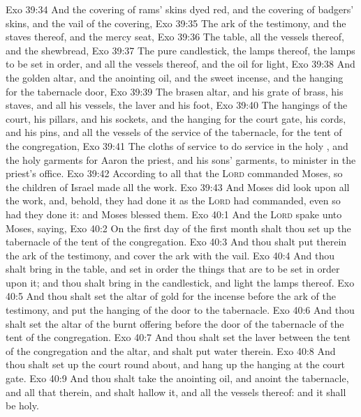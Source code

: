 \vs Exo 39:34 And the covering of rams' skins dyed red, and the covering of badgers' skins, and the vail of the covering,
\vs Exo 39:35 The ark of the testimony, and the staves thereof, and the mercy seat,
\vs Exo 39:36 The table,  all the vessels thereof, and the shewbread,
\vs Exo 39:37 The pure candlestick,  the lamps thereof,  the lamps to be set in order, and all the vessels thereof, and the oil for light,
\vs Exo 39:38 And the golden altar, and the anointing oil, and the sweet incense, and the hanging for the tabernacle door,
\vs Exo 39:39 The brasen altar, and his grate of brass, his staves, and all his vessels, the laver and his foot,
\vs Exo 39:40 The hangings of the court, his pillars, and his sockets, and the hanging for the court gate, his cords, and his pins, and all the vessels of the service of the tabernacle, for the tent of the congregation,
\vs Exo 39:41 The cloths of service to do service in the holy , and the holy garments for Aaron the priest, and his sons' garments, to minister in the priest's office.
\vs Exo 39:42 According to all that the \textsc{Lord} commanded Moses, so the children of Israel made all the work.
\vs Exo 39:43 And Moses did look upon all the work, and, behold, they had done it as the \textsc{Lord} had commanded, even so had they done it: and Moses blessed them.
\vs Exo 40:1 And the \textsc{Lord} spake unto Moses, saying,
\vs Exo 40:2 On the first day of the first month shalt thou set up the tabernacle of the tent of the congregation.
\vs Exo 40:3 And thou shalt put therein the ark of the testimony, and cover the ark with the vail.
\vs Exo 40:4 And thou shalt bring in the table, and set in order the things that are to be set in order upon it; and thou shalt bring in the candlestick, and light the lamps thereof.
\vs Exo 40:5 And thou shalt set the altar of gold for the incense before the ark of the testimony, and put the hanging of the door to the tabernacle.
\vs Exo 40:6 And thou shalt set the altar of the burnt offering before the door of the tabernacle of the tent of the congregation.
\vs Exo 40:7 And thou shalt set the laver between the tent of the congregation and the altar, and shalt put water therein.
\vs Exo 40:8 And thou shalt set up the court round about, and hang up the hanging at the court gate.
\vs Exo 40:9 And thou shalt take the anointing oil, and anoint the tabernacle, and all that  therein, and shalt hallow it, and all the vessels thereof: and it shall be holy.
